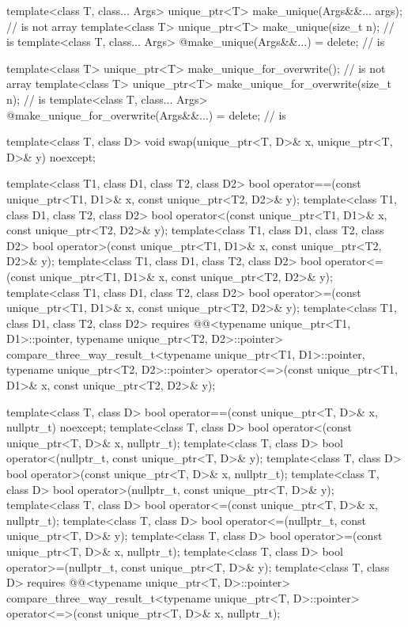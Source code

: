 \begin{codeblock}
{  template<class T, class... Args>
    unique_ptr<T> make_unique(Args&&... args);                                  //  is not array
  template<class T>
    unique_ptr<T> make_unique(size_t n);                                        //  is 
  template<class T, class... Args>
    @\unspecnc@ make_unique(Args&&...) = delete;                                //  is 

  template<class T>
    unique_ptr<T> make_unique_for_overwrite();                                  //  is not array
  template<class T>
    unique_ptr<T> make_unique_for_overwrite(size_t n);                          //  is 
  template<class T, class... Args>
    @\unspecnc@ make_unique_for_overwrite(Args&&...) = delete;                  //  is 

  template<class T, class D>
    void swap(unique_ptr<T, D>& x, unique_ptr<T, D>& y) noexcept;

  template<class T1, class D1, class T2, class D2>
    bool operator==(const unique_ptr<T1, D1>& x, const unique_ptr<T2, D2>& y);
  template<class T1, class D1, class T2, class D2>
    bool operator<(const unique_ptr<T1, D1>& x, const unique_ptr<T2, D2>& y);
  template<class T1, class D1, class T2, class D2>
    bool operator>(const unique_ptr<T1, D1>& x, const unique_ptr<T2, D2>& y);
  template<class T1, class D1, class T2, class D2>
    bool operator<=(const unique_ptr<T1, D1>& x, const unique_ptr<T2, D2>& y);
  template<class T1, class D1, class T2, class D2>
    bool operator>=(const unique_ptr<T1, D1>& x, const unique_ptr<T2, D2>& y);
  template<class T1, class D1, class T2, class D2>
    requires @@<typename unique_ptr<T1, D1>::pointer,
                                       typename unique_ptr<T2, D2>::pointer>
    compare_three_way_result_t<typename unique_ptr<T1, D1>::pointer,
                               typename unique_ptr<T2, D2>::pointer>
      operator<=>(const unique_ptr<T1, D1>& x, const unique_ptr<T2, D2>& y);

  template<class T, class D>
    bool operator==(const unique_ptr<T, D>& x, nullptr_t) noexcept;
  template<class T, class D>
    bool operator<(const unique_ptr<T, D>& x, nullptr_t);
  template<class T, class D>
    bool operator<(nullptr_t, const unique_ptr<T, D>& y);
  template<class T, class D>
    bool operator>(const unique_ptr<T, D>& x, nullptr_t);
  template<class T, class D>
    bool operator>(nullptr_t, const unique_ptr<T, D>& y);
  template<class T, class D>
    bool operator<=(const unique_ptr<T, D>& x, nullptr_t);
  template<class T, class D>
    bool operator<=(nullptr_t, const unique_ptr<T, D>& y);
  template<class T, class D>
    bool operator>=(const unique_ptr<T, D>& x, nullptr_t);
  template<class T, class D>
    bool operator>=(nullptr_t, const unique_ptr<T, D>& y);
  template<class T, class D>
    requires @@<typename unique_ptr<T, D>::pointer>
    compare_three_way_result_t<typename unique_ptr<T, D>::pointer>
      operator<=>(const unique_ptr<T, D>& x, nullptr_t);

}
\end{codeblock}
